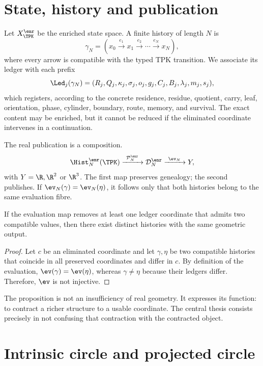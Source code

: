 \section{State, history and publication}

Let \(X_{\TPK}^{\enr}\) be the enriched state space. A finite
history of length \(N\) is
\[
 \gamma_N=(x_0\xrightarrow{e_1}x_1\xrightarrow{e_2}\cdots
 \xrightarrow{e_N}x_N),
\]
where every arrow is compatible with the typed TPK transition. We associate its ledger with each prefix
\[
 \Led_j(\gamma_N)=
 (R_j,Q_j,\kappa_j,\sigma_j,o_j,g_j,C_j,B_j,
  \lambda_j,m_j,s_j),
\]
which registers, according to the concrete residence, residue, quotient, carry,
leaf, orientation, phase, cylinder, boundary, route, memory, and survival.
The exact content may be enriched, but it cannot be reduced if the
eliminated coordinate intervenes in a continuation.

The real publication is a composition.
\[
 \Hist_N^{\enr}(\TPK)
 \xrightarrow{\ \mathcal P_N^{\enr}\ }
 \mathcal D_N^{\enr}
 \xrightarrow{\ \ev_N\ }
 Y,
\]
with \(Y=\R,\R^2\) or \(\R^3\). The first map preserves genealogy; the
second publishes. If \(\ev_N(\gamma)=\ev_N(\eta)\), it follows only that
both histories belong to the same evaluation fibre.

\begin{proposition}
If the evaluation map removes at least one ledger coordinate that
admits two compatible values, then there exist distinct histories with the
same geometric output.
\end{proposition}
\begin{proof}
Let \(c\) be an eliminated coordinate and let \(\gamma,\eta\) be two
compatible histories that coincide in all preserved coordinates and differ in
\(c\). By definition of the evaluation, \(\ev(\gamma)=\ev(\eta)\), whereas
\(\gamma\neq\eta\) because their ledgers differ. Therefore, \(\ev\) is not
injective.
\end{proof}

The proposition is not an insufficiency of real geometry. It expresses its
function: to contract a richer structure to a usable coordinate. The
central thesis consists precisely in not confusing that contraction with the
contracted object.

\section{Intrinsic circle and projected circle}

